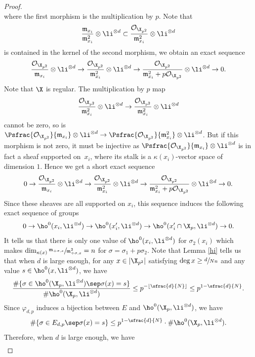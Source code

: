 \begin{proof}
\[\]
where the first morphism is the multiplication by $p$. Note that
\[
\frac{\mathfrak{m}_{x_i}}{\mathfrak{m}_{x_i}^2}\otimes \li^{\otimes d}\subset \frac{\mathcal{O}_{\X_{p^2}}}{\mathfrak{m}_{x_i}^2}\otimes \li^{\otimes d}
\]
is contained in the kernel of the second morphism, we obtain an exact sequence
\[
\frac{\mathcal{O}_{\X_{p^2}}}{\mathfrak{m}_{x_i}}\otimes \li^{\otimes d} \to \frac{\mathcal{O}_{\X_{p^2}}}{\mathfrak{m}_{x_i}^2}\otimes \li^{\otimes d} \to \frac{\mathcal{O}_{\X_{p^2}}}{\mathfrak{m}_{x_i}^2+p\mathcal{O}_{\X_{p^2}}}\otimes \li^{\otimes d}\to 0.
\]
Note that $\X$ is regular. The multiplication by $p$ map
\[
\frac{\mathcal{O}_{\X_{p^2}}}{\mathfrak{m}_{x_i}^2}\otimes \li^{\otimes d} \to \frac{\mathcal{O}_{\X_{p^2}}}{\mathfrak{m}_{x_i}^2}\otimes \li^{\otimes d}
\]
cannot be zero, so is $ \Psfrac{\mathcal{O}_{\X_{p^2}}}{\mathfrak{m}_{x_i}}\otimes \li^{\otimes d} \to \Psfrac{\mathcal{O}_{\X_{p^2}}}{\mathfrak{m}_{x_i}^2}\otimes \li^{\otimes d}$. But if this morphism is not zero, it must be injective as $\Psfrac{\mathcal{O}_{\X_{p^2}}}{\mathfrak{m}_{x_i}}\otimes \li^{\otimes d} $ is in fact a sheaf supported on~$x_i$, where its stalk is a $\kappa(x_i)$-vector space of dimension $1$. Hence we get a short exact sequence
\[
0\to \frac{\mathcal{O}_{\X_{p^2}}}{\mathfrak{m}_{x_i}}\otimes \li^{\otimes d} \to \frac{\mathcal{O}_{\X_{p^2}}}{\mathfrak{m}_{x_i}^2}\otimes \li^{\otimes d} \to \frac{\mathcal{O}_{\X_{p^2}}}{\mathfrak{m}_{x_i}^2+p\mathcal{O}_{\X_{p^2}}}\otimes \li^{\otimes d}\to 0.
\]
Since these sheaves are all supported on $x_i$, this sequence induces the following exact sequence of groups
\[
0\to \ho^0(x_i, \li^{\otimes d})\to \ho^0(x_i', \li^{\otimes d}) \to \ho^0(x_i'\cap \X_p, \li^{\otimes d}) \to 0.
\]
It tells us that there is only one value of $ \ho^0(x_i, \li^{\otimes d})$ for $\sigma_2(x_i)$ which makes $\dim_{\kappa(x)}\sfrac{\mathfrak{m}_{\div \sigma,x}}{\mathfrak{m}_{\div \sigma,x}^2}=n$ for $\sigma=\sigma_1+p\sigma_2$. Note that Lemma \ref{hi} tells us that when $d$ is large enough, for any $x\in |\X_{p^2}|$ satisfying $\deg x\geq \sfrac{d}{Nn}$ and any value $s\in \ho^0(x,\li^{\otimes d})$, we have
\[
\frac{\#\{ \sigma\in \ho^0(\X_p, \li^{\otimes d})\sep \sigma(x)=s \} }{\#\ho^0(\X_p,\li^{\otimes d})} \leq p^{-\lfloor\sfrac{d}{N}\rfloor} \leq p^{1-\sfrac{d}{N}}.
\]
Since $\varphi_{d,p}$ induces a bijection between $E$ and $\ho^0(\X_p, \li^{\otimes d})$, we have
\[
\#\{ \sigma\in E_{d,p}\sep \sigma(x)=s \} \leq p^{1-\sfrac{d}{N}}\cdot \#\ho^0(\X_p, \li^{\otimes d}).
\]
Therefore, when $d$ is large enough, we have
\begin{multline*}

\end{multline*}
\end{proof}
